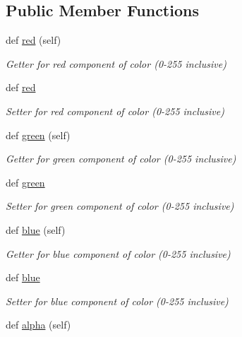 \subsection*{Public Member Functions}
\begin{DoxyCompactItemize}
\item 
def \hyperlink{classbridges_1_1color_1_1_color_ab2b29fe67b6ad8dddde7ff8eddedcce0}{red} (self)
\begin{DoxyCompactList}\small\item\em Getter for red component of color (0-\/255 inclusive) \end{DoxyCompactList}\item 
def \hyperlink{classbridges_1_1color_1_1_color_a39719b281c9095293a1445c6deb7792b}{red}
\begin{DoxyCompactList}\small\item\em Setter for red component of color (0-\/255 inclusive) \end{DoxyCompactList}\item 
def \hyperlink{classbridges_1_1color_1_1_color_a86ec858a55491936054abcea865498ec}{green} (self)
\begin{DoxyCompactList}\small\item\em Getter for green component of color (0-\/255 inclusive) \end{DoxyCompactList}\item 
def \hyperlink{classbridges_1_1color_1_1_color_a4c0826514c64b53910270336d357ad80}{green}
\begin{DoxyCompactList}\small\item\em Setter for green component of color (0-\/255 inclusive) \end{DoxyCompactList}\item 
def \hyperlink{classbridges_1_1color_1_1_color_a14f94eb29dcabf578a1932c5477e12f3}{blue} (self)
\begin{DoxyCompactList}\small\item\em Getter for blue component of color (0-\/255 inclusive) \end{DoxyCompactList}\item 
def \hyperlink{classbridges_1_1color_1_1_color_a0673063270c8a522b086a916f09dd1f5}{blue}
\begin{DoxyCompactList}\small\item\em Setter for blue component of color (0-\/255 inclusive) \end{DoxyCompactList}\item 
def \hyperlink{classbridges_1_1color_1_1_color_ae5dc631fcda27156867b21109620ae21}{alpha} (self)

\end{DoxyCompactItemize}
